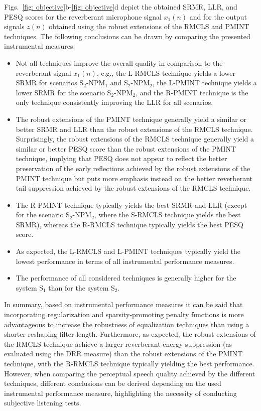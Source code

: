 \documentclass[fleqn]{aes2e}
\begin{document}
Figs.~\ref{fig: objective}b-\ref{fig: objective}d depict the obtained SRMR, LLR, and PESQ scores for the reverberant microphone signal $x_1(n)$ and for the output signals $z(n)$ obtained using the robust extensions of the RMCLS and PMINT techniques.
The following conclusions can be drawn by comparing the presented instrumental measures:
\begin{itemize}
\item Not all techniques improve the overall quality in comparison to the reverberant signal $x_1(n)$, e.g., the L-RMCLS technique yields a lower SRMR for scenarios S$_2$-NPM$_1$ and S$_2$-NPM$_2$, the L-PMINT technique yields a lower SRMR for the scenario S$_2$-NPM$_2$, and the R-PMINT technique is the only technique consistently improving the LLR for all scenarios.
\item The robust extensions of the PMINT technique generally yield a similar or better SRMR and LLR than the robust extensions of the RMCLS technique. 
Surprisingly, the robust extensions of the RMCLS technique generally yield a similar or better PESQ score than the robust extensions of the PMINT technique, implying that PESQ does not appear to reflect the better preservation of the early reflections achieved by the robust extensions of the PMINT technique but puts more emphasis instead on the better reverberant tail suppression achieved by the robust extensions of the RMCLS technique.
\item The R-PMINT technique typically yields the best SRMR and LLR (except for the scenario S$_2$-NPM$_2$, where the S-RMCLS technique yields the best SRMR), whereas the R-RMCLS technique typically yields the best PESQ score. 
\item As expected, the L-RMCLS and L-PMINT techniques typically yield the lowest performance in terms of all instrumental performance measures.
\item The performance of all considered techniques is generally higher for the system S$_1$ than for the system S$_2$. 
\end{itemize}
In summary, based on instrumental performance measures it can be said that incorporating regularization and sparsity-promoting penalty functions is more advantageous to increase the robustness of equalization techniques than using a shorter reshaping filter length.
Furthermore, as expected, the robust extensions of the RMCLS technique achieve a larger reverberant energy suppression (as evaluated using the DRR measure) than the robust extensions of the PMINT technique, with the R-RMCLS technique typically yielding the best performance.
However, when comparing the perceptual speech quality achieved by the different techniques, different conclusions can be derived depending on the used instrumental performance measure, highlighting the necessity of conducting subjective listening tests.
\end{document}
